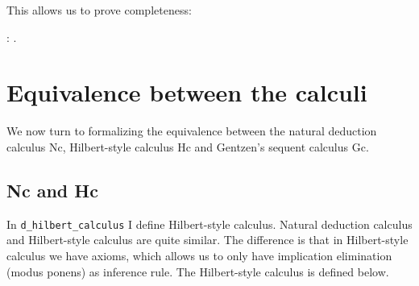 \documentclass{article}
\newenvironment{code}%
 {\small\begin{list}{}%
         {\setlength{\leftmargin}{10mm}}%
         \item[]%
 }
 {\end{list}}
\begin{document}
This allows us to prove completeness:
\begin{code}
\coqdocnoindent
{}  : .\coqdoceol
\end{code}

\section{Equivalence between the calculi}\label{sec_equiv}
We now turn to formalizing the equivalence between the natural deduction calculus Nc, Hilbert-style calculus Hc and Gentzen's sequent calculus Gc.
\subsection{Nc and Hc}\label{sec_equiv_Hc}
In \verb"d_hilbert_calculus" I define Hilbert-style calculus. Natural deduction calculus and Hilbert-style calculus are quite similar. The difference is that in Hilbert-style calculus we have axioms, which allows us to only have implication elimination (modus ponens) as inference rule. The Hilbert-style calculus is defined below.
\end{document}
